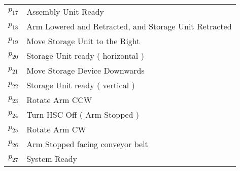 \begin{table}[htbp]
\begin{tabular}{M{5cm}M{10cm}}
\hyperlink{partialNet:p171}{\hypertarget{partialTable:p17}{$p_{17}$}} & Assembly Unit Ready\\
\hyperlink{partialNet:p181}{\hypertarget{partialTable:p18}{$p_{18}$}} & Arm Lowered and Retracted, and Storage Unit Retracted\\
\hyperlink{partialNet:p191}{\hypertarget{partialTable:p19}{$p_{19}$}} & Move Storage Unit to the Right\\
\hyperlink{partialNet:p201}{\hypertarget{partialTable:p20}{$p_{20}$}} & Storage Unit ready ( horizontal )\\
\hyperlink{partialNet:p211}{\hypertarget{partialTable:p21}{$p_{21}$}} & Move Storage Device Downwards\\
\hyperlink{partialNet:p221}{\hypertarget{partialTable:p22}{$p_{22}$}} & Storage Unit ready ( vertical )\\
\hyperlink{partialNet:p231}{\hypertarget{partialTable:p23}{$p_{23}$}} & Rotate Arm CCW\\
\hyperlink{partialNet:p241}{\hypertarget{partialTable:p24}{$p_{24}$}} & Turn HSC Off ( Arm Stopped )\\
\hyperlink{partialNet:p251}{\hypertarget{partialTable:p25}{$p_{25}$}} & Rotate Arm CW\\
\hyperlink{partialNet:p261}{\hypertarget{partialTable:p26}{$p_{26}$}} & Arm Stopped facing conveyor belt\\
\hyperlink{partialNet:p271}{\hypertarget{partialTable:p27}{$p_{27}$}} & System Ready\\
\end{tabular}
\end{table}
